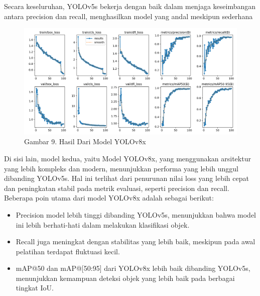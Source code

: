 \documentclass[12pt,a4paper]{article}
\begin{document}
\begin{adjustwidth}{3em}{0pt}
\begin{itemize}
Secara keseluruhan, YOLOv5s bekerja dengan baik dalam menjaga keseimbangan antara precision dan recall, menghasilkan model yang andal meskipun sederhana
\end{itemize}
\begin{adjustwidth}{3em}{0pt}
\begin{figure}[h]
    \centering
    \includegraphics[width=0.6\linewidth]{Images/Gambar9Hasil.png}
    \caption*{Gambar 9. Hasil Dari Model YOLOv8x}
    \label{fig:enter-label}
\end{figure}
\hspace{0.5cm} 
\end{adjustwidth}

\hspace{0.5cm} Di sisi lain, model kedua, yaitu Model YOLOv8x, yang menggunakan arsitektur yang lebih kompleks dan modern, menunjukkan performa yang lebih unggul dibanding YOLOv5s. Hal ini terlihat dari penurunan nilai loss yang lebih cepat dan peningkatan stabil pada metrik evaluasi, seperti precision dan recall. Beberapa poin utama dari model YOLOv8x adalah sebagai berikut:
\begin{itemize}
    \item Precision model lebih tinggi dibanding YOLOv5s, menunjukkan bahwa model ini lebih berhati-hati dalam melakukan klasifikasi objek.
    \item Recall juga meningkat dengan stabilitas yang lebih baik, meskipun pada awal pelatihan terdapat fluktuasi kecil.
    \item mAP@50 dan mAP@[50:95] dari YOLOv8x lebih baik dibanding YOLOv5s, menunjukkan kemampuan deteksi objek yang lebih baik pada berbagai tingkat IoU.


\end{itemize}
\end{adjustwidth}
\end{document}
